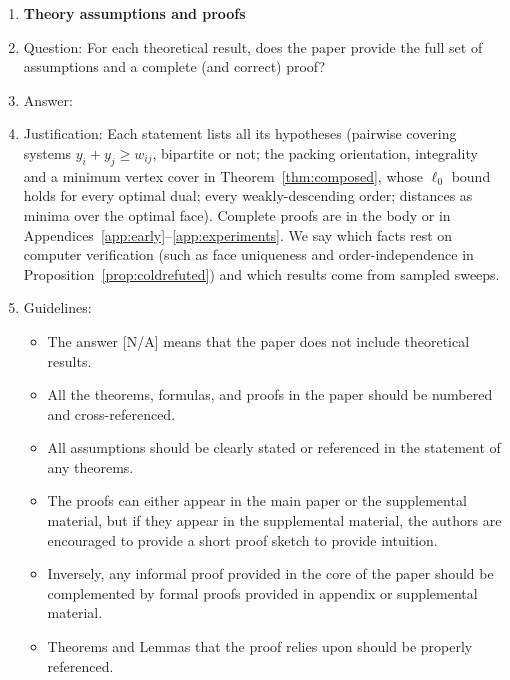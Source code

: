 \begin{enumerate}
\begin{itemize}
        \item The authors should discuss the computational efficiency of the proposed algorithms and how they scale with dataset size.
        \item If applicable, the authors should discuss possible limitations of their approach to address problems of privacy and fairness.
        \item While the authors might fear that complete honesty about limitations might be used by reviewers as grounds for rejection, a worse outcome might be that reviewers discover limitations that aren't acknowledged in the paper. The authors should use their best judgment and recognize that individual actions in favor of transparency play an important role in developing norms that preserve the integrity of the community. Reviewers will be specifically instructed to not penalize honesty concerning limitations.
    \end{itemize}

\item {\bf Theory assumptions and proofs}
    \item[] Question: For each theoretical result, does the paper provide the full set of assumptions and a complete (and correct) proof?
    \item[] Answer: \answerYes{}
    \item[] Justification: Each statement lists all its hypotheses (pairwise covering systems $y_i+y_j\ge w_{ij}$, bipartite or not; the packing orientation, integrality and a minimum vertex cover in Theorem~\ref{thm:composed}, whose $\ell_0$ bound holds for every optimal dual; every weakly-descending order; distances as minima over the optimal face). Complete proofs are in the body or in Appendices~\ref{app:early}--\ref{app:experiments}. We say which facts rest on computer verification (such as face uniqueness and order-independence in Proposition~\ref{prop:coldrefuted}) and which results come from sampled sweeps.
    \item[] Guidelines:
    \begin{itemize}
        \item The answer [N/A] means that the paper does not include theoretical results.
        \item All the theorems, formulas, and proofs in the paper should be numbered and cross-referenced.
        \item All assumptions should be clearly stated or referenced in the statement of any theorems.
        \item The proofs can either appear in the main paper or the supplemental material, but if they appear in the supplemental material, the authors are encouraged to provide a short proof sketch to provide intuition.
        \item Inversely, any informal proof provided in the core of the paper should be complemented by formal proofs provided in appendix or supplemental material.
        \item Theorems and Lemmas that the proof relies upon should be properly referenced.
    \end{itemize}


\end{enumerate}
